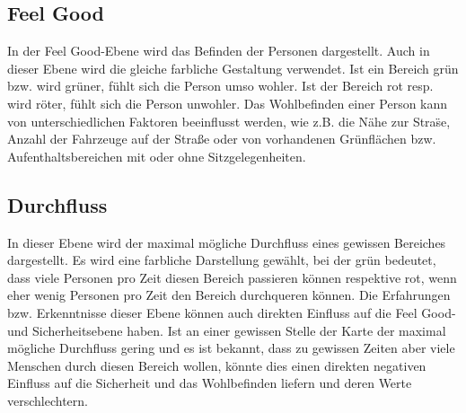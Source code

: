 \documentclass[10pt]{scrartcl}
\begin{document}
\subsection{Feel Good}
In der Feel Good-Ebene wird das Befinden der Personen dargestellt. Auch in dieser Ebene wird die gleiche farbliche Gestaltung verwendet. Ist ein Bereich gr\"un bzw. wird gr\"uner, f\"uhlt sich die Person umso wohler. Ist der Bereich rot resp. wird r\"oter, f\"uhlt sich die Person unwohler. Das Wohlbefinden einer Person kann von unterschiedlichen Faktoren beeinflusst werden, wie z.B. die N\"ahe zur Stra\"se, Anzahl der Fahrzeuge auf der Straße oder von vorhandenen Gr\"unfl\"achen bzw. Aufenthaltsbereichen mit oder ohne Sitzgelegenheiten.

\subsection{Durchfluss}
In dieser Ebene wird der maximal m\"ogliche Durchfluss eines gewissen Bereiches dargestellt. Es wird eine farbliche Darstellung gew\"ahlt, bei der gr\"un bedeutet, dass viele Personen pro Zeit diesen Bereich passieren k\"onnen respektive rot, wenn eher wenig Personen pro Zeit den Bereich durchqueren k\"onnen.
\newline Die Erfahrungen bzw. Erkenntnisse dieser Ebene k\"onnen auch direkten Einfluss auf die Feel Good- und Sicherheitsebene haben. Ist an einer gewissen Stelle der Karte der maximal m\"ogliche Durchfluss gering und es ist bekannt, dass zu gewissen Zeiten aber viele Menschen durch diesen Bereich wollen, k\"onnte dies einen direkten negativen Einfluss auf die Sicherheit und das Wohlbefinden liefern und deren Werte verschlechtern.
\end{document}
